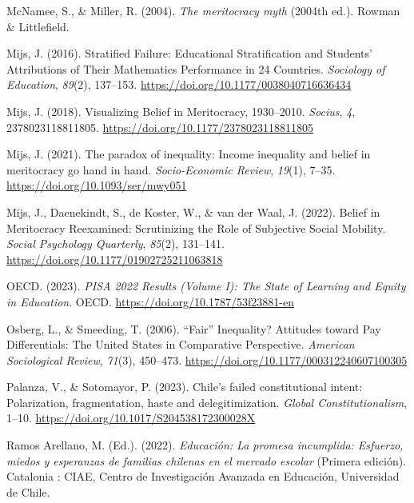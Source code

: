 \documentclass[
  12pt,
  a4paper,
]{article}
\newlength{\cslhangindent}
\newenvironment{CSLReferences}[2] %
 {%
  \setlength{\parindent}{0pt}
  \ifodd #1 \everypar{\setlength{\hangindent}{\cslhangindent}}\ignorespaces\fi
  \ifnum #2 > 0
  \setlength{\parskip}{#2\baselineskip}
  \fi
 }%
 {}
\begin{document}
\begin{CSLReferences}{1}{0}
McNamee, S., \& Miller, R. (2004). \emph{The meritocracy myth} (2004th ed.). Rowman \& Littlefield.

Mijs, J. (2016). Stratified {Failure}: {Educational Stratification} and {Students}' {Attributions} of {Their Mathematics Performance} in 24 {Countries}. \emph{Sociology of Education}, \emph{89}(2), 137--153. \url{https://doi.org/10.1177/0038040716636434}

Mijs, J. (2018). Visualizing {Belief} in {Meritocracy}, 1930--2010. \emph{Socius}, \emph{4}, 2378023118811805. \url{https://doi.org/10.1177/2378023118811805}

Mijs, J. (2021). The paradox of inequality: Income inequality and belief in meritocracy go hand in hand. \emph{Socio-Economic Review}, \emph{19}(1), 7--35. \url{https://doi.org/10.1093/ser/mwy051}

Mijs, J., Daenekindt, S., de Koster, W., \& van der Waal, J. (2022). Belief in {Meritocracy Reexamined}: {Scrutinizing} the {Role} of {Subjective Social Mobility}. \emph{Social Psychology Quarterly}, \emph{85}(2), 131--141. \url{https://doi.org/10.1177/01902725211063818}

OECD. (2023). \emph{{PISA} 2022 {Results} ({Volume I}): {The State} of {Learning} and {Equity} in {Education}}. OECD. \url{https://doi.org/10.1787/53f23881-en}

Osberg, L., \& Smeeding, T. (2006). {``{Fair}''} {Inequality}? {Attitudes} toward {Pay Differentials}: {The United States} in {Comparative Perspective}. \emph{American Sociological Review}, \emph{71}(3), 450--473. \url{https://doi.org/10.1177/000312240607100305}

Palanza, V., \& Sotomayor, P. (2023). Chile's failed constitutional intent: {Polarization}, fragmentation, haste and delegitimization. \emph{Global Constitutionalism}, 1--10. \url{https://doi.org/10.1017/S204538172300028X}

Ramos Arellano, M. (Ed.). (2022). \emph{Educaci{ó}n: {La} promesa incumplida: Esfuerzo, miedos y esperanzas de familias chilenas en el mercado escolar} (Primera edici{ó}n). Catalonia : CIAE, Centro de Investigaci{ó}n Avanzada en Educaci{ó}n, Universidad de Chile.


\end{CSLReferences}
\end{document}

